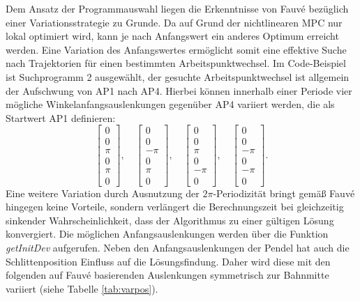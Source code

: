 Dem Ansatz der Programmauswahl liegen die Erkenntnisse von Fauvé \cite{fauve} bezüglich einer Variationsstrategie zu Grunde. Da auf Grund der nichtlinearen MPC nur lokal optimiert wird, kann je nach Anfangswert ein anderes Optimum erreicht werden. Eine Variation des Anfangswertes ermöglicht somit eine effektive Suche nach Trajektorien für einen bestimmten Arbeitspunktwechsel. Im Code-Beispiel ist Suchprogramm 2 ausgewählt, der gesuchte Arbeitspunktwechsel ist allgemein der Aufschwung von AP1 nach AP4. Hierbei können innerhalb einer Periode vier mögliche Winkelanfangsauslenkungen gegenüber AP4 variiert werden, die als Startwert AP1 definieren:
\[
	\begin{bmatrix}
		0 \\ 0 \\ \pi \\ 0 \\ \pi \\ 0
	\end{bmatrix}, \quad
	\begin{bmatrix}
		0 \\ 0 \\ -\pi \\ 0 \\ \pi \\ 0
	\end{bmatrix}, \quad
	\begin{bmatrix}
		0 \\ 0 \\ \pi \\ 0 \\ -\pi \\ 0
	\end{bmatrix}, \quad
	\begin{bmatrix}
		0 \\ 0 \\ -\pi \\ 0 \\ -\pi \\ 0
	\end{bmatrix} .
\]
Eine weitere Variation durch Ausnutzung der $2\pi$-Periodizität bringt gemäß Fauvé \cite{fauve} hingegen keine Vorteile, sondern verlängert die Berechnungszeit bei gleichzeitig sinkender Wahrscheinlichkeit, dass der Algorithmus zu einer gültigen Lösung konvergiert. Die möglichen Anfangsauslenkungen werden über die Funktion \textit{getInitDev} aufgerufen.
Neben den Anfangsauslenkungen der Pendel hat auch die Schlittenposition Einfluss auf die Lösungsfindung. Daher wird diese mit den folgenden auf Fauvé \cite{fauve} basierenden Auslenkungen symmetrisch zur Bahnmitte variiert (siehe Tabelle \ref{tab:varpos}).
